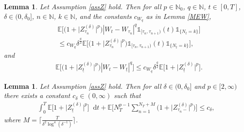 \documentclass[11pt,a4paper]{article}
\numberwithin{equation}{section}
\newtheorem{lemma}[theorem]{Lemma}
\theoremstyle{definition}
\newcommand{\E}{{\mathbb{E}}}
\newcommand{\N}{{\mathbb{N}}}
\newcommand{\diff}{\mathop{}\!\mathrm{d}}
\begin{document}
\begin{lemma}\label{MW}
    Let Assumption \ref{assZ} hold. Then for all $p\in\N_0$, $q\in\N$, $t\in[0,T]$, $\delta \in(0,\delta_0]$, $n\in\N$, $k\in\N$, and the constants $c_{W_q}$ as in Lemma \ref{MEW},
    \begin{equation}\label{MWeq1}
        \begin{aligned}
        &\E\Big[\big(1+ \big|Z^{(\delta)}_{\tau_n}\big|^p\big)   |W_t-W_{\tau_n}|^q \mathds{1}_{[\tau_n,\tau_{n+1})}(t)  \mathds{1}_{\{N_t = k\}} \Big]\\
        &\leq c_{W_q} \delta^{\frac{q}{2}} \E\Big[ \big(1+ \big|Z^{(\delta)}_{\tau_n}\big|^p\big) \mathds{1}_{[\tau_n,\tau_{n+1})}(t)  \mathds{1}_{\{N_t = k\}} \Big],
        \end{aligned}
    \end{equation}
    and
    \begin{equation}\label{MWeq2}
        \begin{aligned}
        &\E\Big[ \big(1+ \big|Z^{(\delta)}_{\underline{t}}\big|^p\big)   |W_t-W_{\underline{t}}|^q \Big]
        \leq c_{W_q} \delta^{\frac{q}{2}} \E\Big[ 1+ \big|Z^{(\delta)}_{\underline{t}}\big|^p \Big].
        \end{aligned}
    \end{equation}
\end{lemma}

\begin{lemma}\label{FiniteMom}
Let Assumption \ref{assZ} hold. Then for all $\delta\in(0,\delta_0]$ and $p\in[2,\infty)$ there exists a constant $c_\delta \in(0,\infty)$ such that 
\begin{equation}\label{LFM1}
    \begin{aligned}
    \int_0^T \E \big[ 1+ \big|Z^{(\delta)}_{\underline t}\big|^p\big] \diff t
    +\E\Big[ N_T^{p-1} \sum_{n=1}^{N_T + M} \big(1+ \big|Z^{(\delta)}_{\tau_{n}-}\big|^p\big) \Big] \leq c_\delta,
    \end{aligned}
\end{equation}
where $M = \Big\lceil \frac{T}{\delta^2 \log^4(\delta^{-1})} \Big\rceil$.
\end{lemma}
\end{document}
